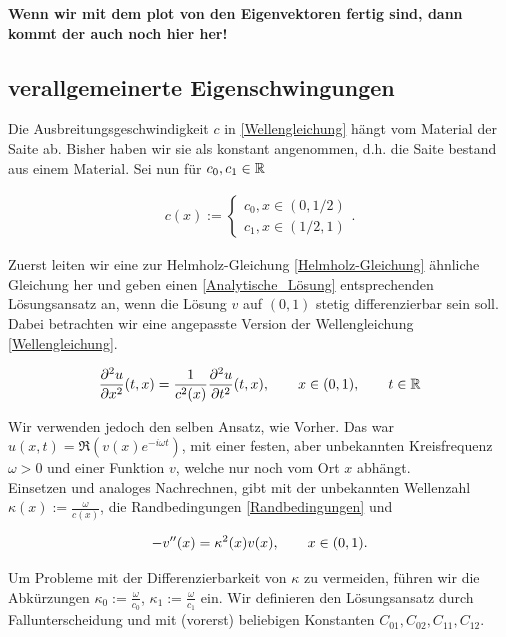 \textbf{Wenn wir mit dem plot von den Eigenvektoren fertig sind, dann kommt der auch noch hier her!}

\subsection{verallgemeinerte Eigenschwingungen}

Die Ausbreitungsgeschwindigkeit $c$ in \eqref{Wellengleichung} hängt vom Material der Saite ab. Bisher haben wir sie als konstant angenommen, d.h. die Saite bestand aus einem Material. Sei nun für $c_0, c_1 \in \mathbb{R}$

\begin{align} \label{Material-Funktion}
  c(x) :=
  \begin{cases}
    c_0, x \in (0, 1/2) \\
    c_1, x \in (1/2, 1)
  \end{cases}.
\end{align}

Zuerst leiten wir eine zur Helmholz-Gleichung \eqref{Helmholz-Gleichung} ähnliche Gleichung her und geben einen \eqref{Analytische_Lösung} entsprechenden Lösungsansatz an, wenn die Lösung $v$ auf $(0, 1)$ stetig differenzierbar sein soll.
Dabei betrachten wir eine angepasste Version der Wellengleichung \eqref{Wellengleichung}.

\begin{align*}
  \frac{\partial^2 u}{\partial x^2} (t, x) =
  \frac{1}{c^2(x)}
  \frac{\partial^2 u}{\partial t^2} (t, x), \qquad
  x \in (0, 1), \qquad
  t \in \mathbb{R}
\end{align*}

Wir verwenden jedoch den selben Ansatz, wie Vorher. Das war $u(x, t) = \mathfrak{R} (v(x) e^{-i \omega t})$, mit einer festen, aber unbekannten Kreisfrequenz $\omega > 0$ und einer Funktion $v$, welche nur noch vom Ort $x$ abhängt. \\

Einsetzen und analoges Nachrechnen, gibt mit der unbekannten Wellenzahl $\kappa(x) := \frac{\omega}{c(x)}$, die Randbedingungen \eqref{Randbedingungen} und

\begin{align} \label{Helmholz-Gleichung}
  -v^{\prime \prime}(x) = \kappa^2(x) v(x), \qquad
  x \in (0, 1).
\end{align}

Um Probleme mit der Differenzierbarkeit von $\kappa$ zu vermeiden, führen wir die Abkürzungen $\kappa_0 := \frac{\omega}{c_0}$, $\kappa_1 := \frac{\omega}{c_1}$ ein. Wir definieren den Lösungsansatz durch Fallunterscheidung und mit (vorerst) beliebigen Konstanten $C_{01}, C_{02}, C_{11}, C_{12}$.

